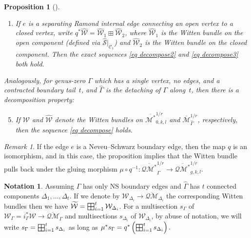 \documentclass[11pt]{amsart}
\newtheorem{pr}[dummy]{Proposition}
\theoremstyle{definition}
\newtheorem{nn}[dummy]{Notation}
\theoremstyle{remark}
\newtheorem{rmk}[dummy]{Remark}
\newcommand{\oQMb}{{\overline{\mathcal{QM}}}}
\newcommand{\<}{\left<}
\renewcommand{\>}{\right>}
\numberwithin{equation}{section}
\def\Mbar{{\overline{\mathcal M}}}
\def\Mbarstar{{\overline{\mathcal M^*}}}
\DeclareMathOperator*{\bboxplus}{\scalerel*{\boxplus}{\sum}}
\begin{document}
\begin{pr}[{\cite[Proposition 2.20]{TZ1}}]
\begin{enumerate}
\item If $e$ is a separating Ramond internal edge connecting an open vertex to a closed vertex, write $q^*\widehat{\mathcal{W}} = \widehat{\mathcal{W}}_1 \boxplus \widehat{\mathcal{W}}_2$, where $\widehat{\mathcal{W}}_1$ is the Witten bundle on the open component (defined via $\widehat{\mathcal{S}}|_{\mathcal{C}_1}$) and $\widehat{\mathcal{W}}_2$ is the Witten bundle on the closed component.  Then the exact sequences \eqref{eq decompose2} and \eqref{eq decompose3} both hold.
\end{enumerate}
Analogously, for genus-zero $\Gamma$ which has a single vertex, no edges, and a contracted boundary tail~$t$, and $\widehat{\Gamma}$ is the detaching of $\Gamma$ along~$t$, then there is a decomposition property:
\begin{enumerate}
\setcounter{enumi}{4}
\item\label{it decompose cb tail} If ${\mathcal{W}}$ and $\widehat{\mathcal{W}}$ denote the Witten bundles on $\Mbarstar_{0,k,l}^{1/r}$ and $\Mbar_{\widehat\Gamma}^{1/r}$, respectively, then the sequence \eqref{eq decompose} holds.
\end{enumerate}
\end{pr}

\begin{rmk}\label{rmk decompose NS boundary node}
If the edge $e$ is a Neveu--Schwarz boundary edge, then the map $q$ is an isomorphism, and in this case, the proposition implies that the Witten bundle pulls back under the gluing morphism $\mu\circ q^{-1}\colon\overline{\mathcal{QM}^*}_{\widehat\Gamma}^{1/r} \to \overline{\mathcal{QM}^*}_{g,k,l}^{1/r}$.

\end{rmk}

\begin{nn}
    Assuming $\Gamma$ has only NS boundary edges and $\widehat{\Gamma}$ has $t$ connected components $\Delta_1,\dots, \Delta_t$. If we denote by $\mathcal W_{\Delta_i}\to \oQMb_{\Delta_i}$ the corresponding Witten bundles then we have $\widetilde{\mathcal W}=\bboxplus_{i=1}^t \mathcal W_{\Delta_i}$. For a multisection $s_{\Gamma}$ of $\mathcal W_{\Gamma}=i_{\Gamma}^* \mathcal W \to \oQMb_{\Gamma}$ and multisections $s_{\Delta_i}$ of $\mathcal W_{\Delta_i}$, 
    by abuse of notation, we will write 
    $
     s_{\Gamma}=\bboxplus_{i=1}^t s_{\Delta_i}
    $
    as long as
    $
     \mu^*s_{\Gamma}= q^*\left(\bboxplus_{i=1}^t s_{\Delta_i} \right).
    $
\end{nn}
\end{document}
